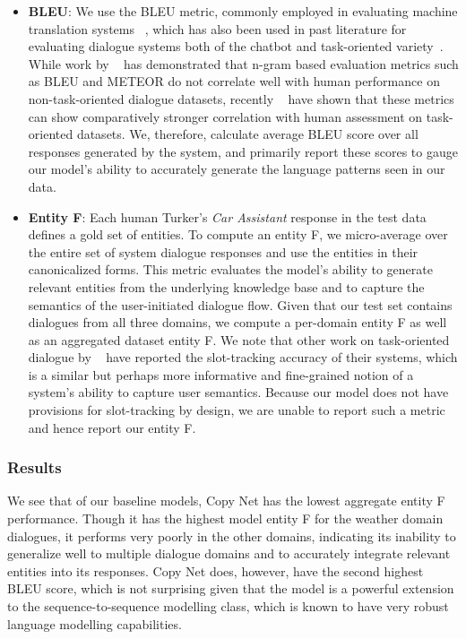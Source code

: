 \documentclass[11pt,a4paper]{article}
\begin{document}
\begin{itemize}
  \item \textbf{BLEU}: We use the BLEU metric, commonly employed in evaluating machine translation systems ~\cite{papineni-EtAl:2002:ACL}, which has also been used in past literature for evaluating dialogue systems both of the chatbot and task-oriented variety~\cite{Ritter:11a,li-EtAl:2016:N16-11,Wen:16}. While work by ~\cite{liu-EtAl:2016:EMNLP20163} has demonstrated that n-gram based evaluation metrics such as BLEU and METEOR do not correlate well with human performance on non-task-oriented dialogue datasets, recently ~\cite{Sharma:17} have shown that these metrics can show comparatively stronger correlation with human assessment on task-oriented datasets. We, therefore, calculate average BLEU score over all responses generated by the system, and primarily report these scores to gauge our model's ability to accurately generate the language patterns seen in our data.  

  \item \textbf{Entity F}: Each human Turker's \emph{Car Assistant} response in the test data defines a gold set of entities. To compute an entity F, we micro-average over the entire set of system dialogue responses and use the entities in their canonicalized forms. This metric evaluates the model's ability to generate relevant entities from the underlying knowledge base and to capture the semantics of the user-initiated dialogue flow. Given that our test set contains dialogues from all three domains, we compute a per-domain entity F as well as an aggregated dataset entity F. We note that other work on task-oriented dialogue by ~\cite{Wen:16,Henderson:14} have reported the slot-tracking accuracy of their systems, which is a similar but perhaps more informative and fine-grained notion of a system's ability to capture user semantics. Because our model does not have provisions for slot-tracking by design, we are unable to report such a metric and hence report our entity F. 

\end{itemize}

\subsubsection{Results}


We see that of our baseline models, Copy Net has the lowest aggregate entity F performance. Though it has the highest model entity F for the weather domain dialogues, it performs very poorly in the other domains, indicating its inability to generalize well to multiple dialogue domains and to accurately integrate relevant entities into its responses. Copy Net does, however, have the second highest BLEU score, which is not surprising given that the model is a powerful extension to the sequence-to-sequence modelling class, which is known to have very robust language modelling capabilities. 
\end{document}
